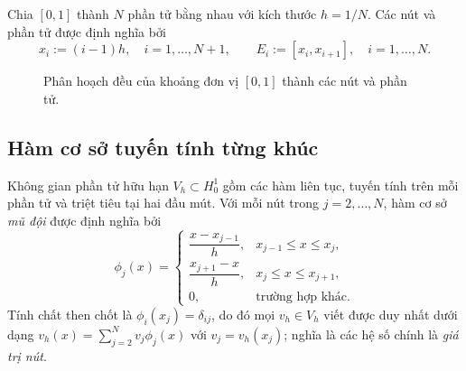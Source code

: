 \documentclass[11pt,a4paper]{article}
\theoremstyle{plain}
\theoremstyle{definition}
\theoremstyle{remark}
\newcommand{\Hzero}{H^{1}_{0}}
\newcommand{\Vh}{V_{h}}
\begin{document}
Chia $[0,1]$ thành $N$ phần tử bằng nhau với kích thước $h = 1/N$. Các nút và
phần tử được định nghĩa bởi
\begin{equation}
\label{eq:mesh}
  x_{i} := (i-1)h,\quad i = 1,\dots,N+1,
  \qquad
  E_{i} := [x_{i}, x_{i+1}],\quad i = 1,\dots,N .
\end{equation}

\begin{figure}[H]
\centering
{}
\caption{Phân hoạch đều của khoảng đơn vị $[0,1]$ thành các nút và phần tử.}
\label{fig:mesh}
\end{figure}

\subsection{Hàm cơ sở tuyến tính từng khúc}

Không gian phần tử hữu hạn $\Vh \subset \Hzero$ gồm các hàm liên tục, tuyến
tính trên mỗi phần tử và triệt tiêu tại hai đầu mút. Với mỗi nút trong
$j = 2,\dots,N$, hàm cơ sở \emph{mũ đội} được định nghĩa bởi
\begin{equation}
\label{eq:hatfun}
  \phi_{j}(x) =
  \begin{cases}
    \dfrac{x - x_{j-1}}{h}, & x_{j-1} \le x \le x_{j}, \\[9pt]
    \dfrac{x_{j+1} - x}{h}, & x_{j} \le x \le x_{j+1}, \\[6pt]
    0, & \text{trường hợp khác.}
  \end{cases}
\end{equation}
Tính chất then chốt là $\phi_{i}(x_{j}) = \delta_{ij}$, do đó mọi
$v_{h} \in \Vh$ viết được duy nhất dưới dạng
$v_{h}(x) = \sum_{j=2}^{N} v_{j}\phi_{j}(x)$ với $v_{j} = v_{h}(x_{j})$;
nghĩa là các hệ số chính là \emph{giá trị nút}.
\end{document}

